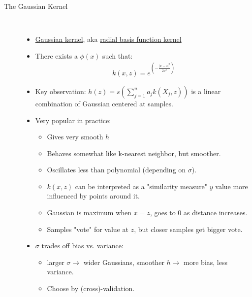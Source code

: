 \documentclass[10pt]{article}
\begin{document}
\begin{description}
	\item[The Gaussian Kernel]
	\
	\begin{itemize}
		\item \underline{Gaussian kernel}, aka \underline{radial basis function kernel}
		\item There exists a $\phi(x)$ such that:
			\begin{align*}
				k(x, z) = e^{(-\frac{|x-z|^{2}}{2\sigma^{2}})}
			\end{align*}
		\item Key observation: $h(z) = s(\sum_{j=1}^{n} a_{j}k(X_{j}, z))$ is a linear combination of Gaussian centered at samples.
		\item Very popular in practice:
			\begin{itemize}
				\item Gives very smooth $h$
				\item Behaves somewhat like k-nearest neighbor, but smoother.
				\item Oscillates less than polynomial (depending on $\sigma$).
				\item $k(x,z)$ can be interpreted as a "similarity measure" $y$ value more influenced by points around it.
				\item Gaussian is maximum when $x=z$, goes to 0 as distance increases.
				\item Samples "vote" for value at $z$, but closer samples get bigger vote.
			\end{itemize}
		\item $\sigma$ trades off bias vs. variance:
			\begin{itemize}
				\item larger $\sigma \rightarrow$ wider Gaussians, smoother $h \rightarrow$ more bias, less variance.
				\item Choose by (cross)-validation.
			\end{itemize}
	\end{itemize}
\end{description}
\end{document}
